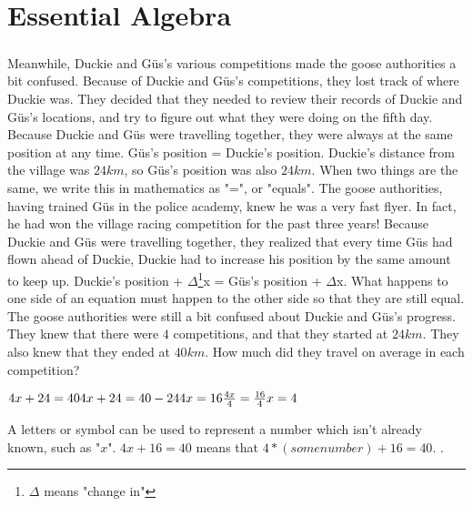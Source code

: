 \chapter{Essential Algebra}
\paragraph{} Meanwhile, Duckie and Güs's various competitions made the goose authorities a bit confused. Because of Duckie and Güs's competitions, they lost track of where Duckie was. They decided that they needed to review their records of Duckie and Güs's locations, and try to figure out what they were doing on the fifth day. 
\vfill
\pagebreak
{Because Duckie and Güs were travelling together, they were always at the same position at any time.}
{Güs's position = Duckie's position. Duckie's distance from the village was $24km$, so Güs's position was also $24km$.}
{When two things are the same, we write this in mathematics as "=", or "equals".}
{}
{The goose authorities, having trained Güs in the police academy, knew he was a very fast flyer. In fact, he had won the village racing competition for the past three years! Because Duckie and Güs were travelling together, they realized that every time Güs had flown ahead of Duckie, Duckie had to increase his position by the same amount to keep up.}
{Duckie's position + $\Delta$\footnote{$\Delta$ means "change in"}x = Güs's position + $\Delta$x.}
{What happens to one side of an equation must happen to the other side so that they are still equal.}
{}
{The goose authorities were still a bit confused about Duckie and Güs's progress. They knew that there were $4$ competitions, and that they started at $24 km$. They also knew that they ended at $40 km$. How much did they travel on average in each competition?}
{\begin{center}$4x + 24 = 40 \linebreak 4x + 24 = 40 - 24 \linebreak 4x = 16 \linebreak \frac{4x}{4} = \frac{16}{4} \linebreak x = 4  $\end{center}}
{A letters or symbol can be used to represent a number which isn’t already known, such as "$x$". $4x + 16 = 40$ means that $4\ast(some number) + 16 = 40$.}
{}.